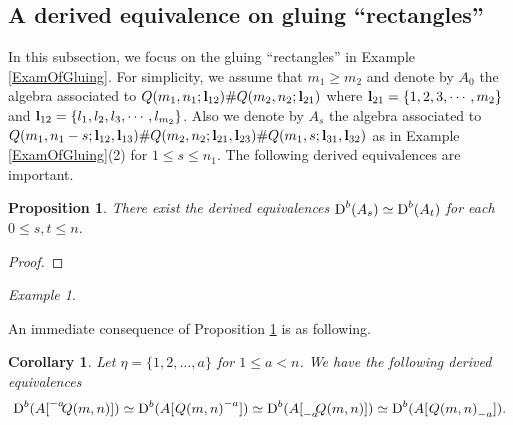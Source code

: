\documentclass[a4paper, reqno]{amsart}
\newtheorem{cor}[thm]{Corollary}
\newtheorem{prop}[thm]{Proposition}
\theoremstyle{definition}
\theoremstyle{remark}
\newtheorem{exm}[thm]{Example}
\numberwithin{equation}{section}
\begin{document}
\subsection{A derived equivalence on gluing ``rectangles''}
In this subsection, we focus on the gluing ``rectangles'' in Example \ref{ExamOfGluing}. For simplicity, we assume that $m_1\geq m_2$ and denote by $A_0$ the algebra associated to $Q(m_1,n_1;{\bf{l}}_{12})\#Q(m_2,n_2;{\bf{l}}_{21})$ where ${\bf{l}}_{21}=\{1,2,3,\cdots,m_2\}$ and ${\bf{l}}_{12}=\{l_1,l_2,l_3,\cdots,l_{m_2}\}$. Also we denote by $A_s$ the algebra associated to $Q(m_1,n_1-s;{\bf{l}}_{12},{\bf{l}}_{13})\#Q(m_2,n_2;{\bf{l}}_{21},{\bf{l}}_{23})\#Q(m_1,s;{\bf{l}}_{31},{\bf{l}}_{32})$ as in Example \ref{ExamOfGluing}(2) for $1\leq s\leq n_1$. The following derived equivalences are important.

\begin{prop}\label{As=At}
There exist the derived equivalences $\textup{D}^{b}(A_s) \simeq \textup{D}^{b}(A_t)$ for each $0\leq s,t\leq n$.   
\end{prop}

\begin{proof}
\end{proof}

\begin{exm}
\end{exm}

An immediate consequence of Proposition \ref{As=At} is as following.

\begin{cor}\label{main1}
Let $\eta = \{1,2,\dots,a\}$ for $1\leq a<n$. We have the following derived equivalences
$$
    \textup{D}^{b}(A[{\vphantom{Q(m,n)}}^{-a}\negmedspace{Q(m,n)}]) \simeq \textup{D}^{b}(A[\;{\vphantom{Q(m,n)}}\negmedspace{Q(m,n)}^{-a}]) \simeq \textup{D}^{b}(A[{\vphantom{Q(m,n)}}_{-a}\negmedspace{Q(m,n)}])\simeq \textup{D}^{b}(A[\;{\vphantom{Q(m,n)}}\negmedspace{Q(m,n)}_{-a}]).
    $$
\end{cor}
\end{document}
